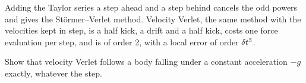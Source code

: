 \begin{keyidea}
Adding the Taylor series a step ahead and a step behind cancels the odd
powers and gives the Störmer--Verlet method. Velocity Verlet, the same
method with the velocities kept in step, is a half kick, a drift and a
half kick, costs one force evaluation per step, and is of order 2, with a
local error of order $\delta t^3$.
\end{keyidea}


\begin{selfcheck}
Show that velocity Verlet follows a body falling under a constant
acceleration $-g$ exactly, whatever the step.
\end{selfcheck}
